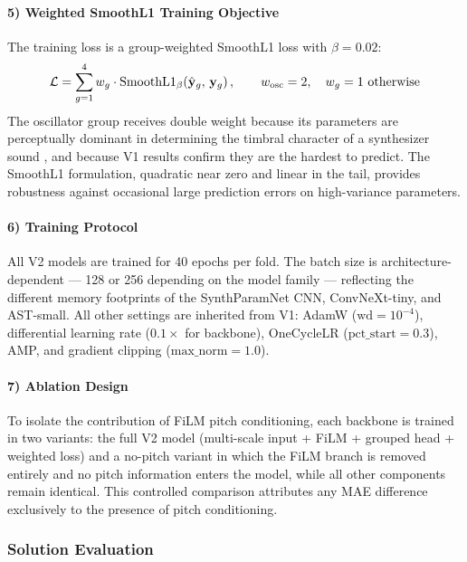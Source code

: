 \paragraph{5) Weighted SmoothL1 Training Objective}
The training loss is a group-weighted SmoothL1 loss with $\beta=0.02$:
\begin{equation}
    \mathcal{L} = \sum_{g=1}^{4} w_g \cdot \text{SmoothL1}_{\beta}\!\left(\hat{\mathbf{y}}_g,\, \mathbf{y}_g\right), \qquad w_{\text{osc}} = 2,\quad w_g = 1 \text{ otherwise}
    \label{eq:weighted_loss}\eqname{Group-weighted SmoothL1 loss}
\end{equation}
The oscillator group receives double weight because its parameters are perceptually dominant in determining the timbral character of a synthesizer sound \cite{roads1996computer}, and because V1 results confirm they are the hardest to predict. The SmoothL1 formulation, quadratic near zero and linear in the tail, provides robustness against occasional large prediction errors on high-variance parameters.

\paragraph{6) Training Protocol}
All V2 models are trained for 40 epochs per fold. The batch size is architecture-dependent — 128 or 256 depending on the model family — reflecting the different memory footprints of the SynthParamNet CNN, ConvNeXt-tiny, and AST-small. All other settings are inherited from V1: AdamW ($\text{wd}=10^{-4}$), differential learning rate ($0.1\times$ for backbone), OneCycleLR ($\text{pct\_start}=0.3$), AMP, and gradient clipping ($\text{max\_norm}=1.0$).

\paragraph{7) Ablation Design}
To isolate the contribution of FiLM pitch conditioning, each backbone is trained in two variants: the full V2 model (multi-scale input + FiLM + grouped head + weighted loss) and a no-pitch variant in which the FiLM branch is removed entirely and no pitch information enters the model, while all other components remain identical. This controlled comparison attributes any MAE difference exclusively to the presence of pitch conditioning.

\subsubsection{Solution Evaluation}

